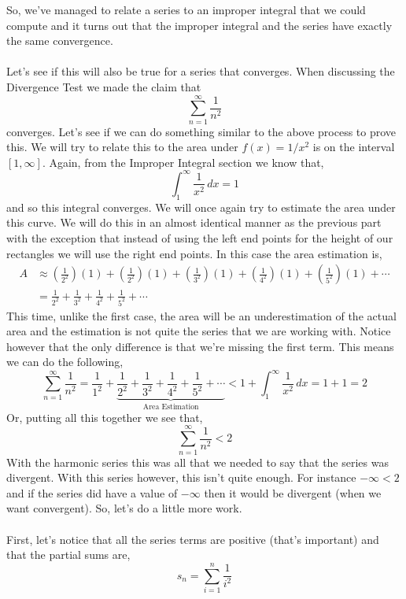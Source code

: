 \documentclass[10pt,reqno]{book}
\theoremstyle{definition}
\begin{document}
	So, we've managed to relate a series to an improper integral that we could compute and it turns out that the improper integral and the series have exactly the same convergence.\\ \\
	Let's see if this will also be true for a series that converges. When discussing the Divergence Test we made the claim that
	\[ \sum\limits_{n=1}^{\infty} \frac{1}{n^2} \]
	converges. Let's see if we can do something similar to the above process to prove this. We will try to relate this to the area under $ f(x) = 1/x^2 $ is on the interval $ [1,\infty] $. Again, from the Improper Integral section we know that,
	\[ \int_{1}^{\infty} \frac{1}{x^2} \, dx = 1 \]
	and so this integral converges. We will once again try to estimate the area under this curve. We will do this in an almost identical manner as the previous part with the exception that instead of using the left end points for the height of our rectangles we will use the right end points. In this case the area estimation is,
	\begin{align*}
		A &\approx \left( \frac{1}{2^2} \right)(1) + \left( \frac{1}{2^2} \right)(1) + \left( \frac{1}{3^2} \right)(1) + \left( \frac{1}{4^2} \right)(1) + \left( \frac{1}{5^2} \right)(1) + \cdots\\
		&= \frac{1}{2^2} + \frac{1}{3^2} + \frac{1}{4^2} + \frac{1}{5^2} + \cdots 
	\end{align*}
	This time, unlike the first case, the area will be an underestimation of the actual area and the estimation is not quite the series that we are working with. Notice however that the only difference is that we're missing the first term.  This means we can do the following,
	\[
	\sum\limits_{n=1}^{\infty} \frac{1}{n^2} = \frac{1}{1^2} + 
	\underbrace{\frac{1}{2^2} + \frac{1}{3^2} + \frac{1}{4^2} + \frac{1}{5^2} + \cdots}_\text{Area Estimation} < 1 + \int_{1}^{\infty} \frac{1}{x^2}\,dx = 1 + 1 = 2
	\]
	Or, putting all this together we see that,
	\[ \sum\limits_{n=1}^{\infty} \frac{1}{n^2} < 2 \]
	With the harmonic series this was all that we needed to say that the series was divergent. With this series however, this isn't quite enough. For instance $ -\infty < 2 $ and if the series did have a value of $ -\infty $ then it would be divergent (when we want convergent). So, let's do a little more work.\\ \\
	First, let's notice that all the series terms are positive (that's important) and that the partial sums are,
	\[ s_n = \sum\limits_{i=1}^{n} \frac{1}{i^2} \]
\end{document}
